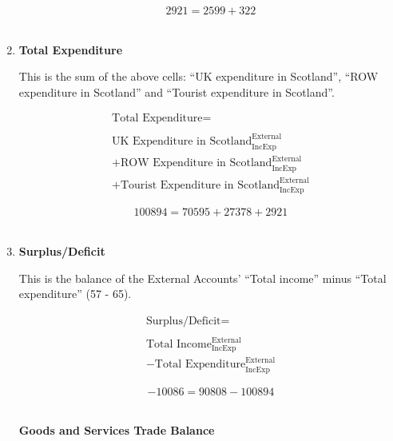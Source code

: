 \begin{enumerate}
\begin{equation} \nonumber
2921 = 2599+322
\end{equation}\\


\item \textbf {Total Expenditure}

This is the sum of the above cells: “UK expenditure in Scotland”, “ROW expenditure in Scotland” and “Tourist expenditure in Scotland”.

\begin{equation}
\begin{split}
\text{Total Expenditure} =  \\ \\
\text{UK Expenditure in Scotland}^\text{External}_\text{IncExp}\\
+\text{ROW Expenditure in Scotland}^\text{External}_\text{IncExp}\\
+\text{Tourist Expenditure in Scotland}^\text{External}_\text{IncExp}
\end{split} \label{eq:2.5.69}
\end{equation}

\begin{equation} \nonumber
100894 = 70595+27378+2921
\end{equation}\\


\item \textbf {Surplus/Deficit}

This is the balance of the External Accounts’ “Total income” minus “Total expenditure” (57 - 65).

\begin{equation}
\begin{split}
\text{Surplus/Deficit} =  \\ \\
\text{Total Income}^\text{External}_\text{IncExp}\\
-\text{Total Expenditure}^\text{External}_\text{IncExp}
\end{split} \label{eq:2.5.70}
\end{equation}

\begin{equation} \nonumber
-10086 = 90808-100894
\end{equation}\\



\pagebreak


\begin{center}
\textbf{\LARGE Goods and Services Trade Balance}
\end{center}


\end{enumerate}
